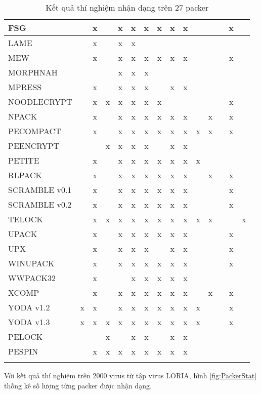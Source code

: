 \begin{tiny}
\begin{longtable}{|l|c|c|c|c|c|c|c|c|c|c|c|c|c|c|}
\hline
FSG					&	&x	&	&x	&x	&x	&x	&x	&x	&	&	&	&x	&	\\
\hline
LAME				&	&x	&	&x	&x	&	&	&	&	&	&	&	&	&	\\
\hline
MEW					&	&x	&	&x	&x	&x	&x	&x	&x	&	&	&	&x	&	\\
\hline
MORPHNAH			&	&	&	&x	&x	&x	&	&	&	&	&	&	&	&	\\
\hline
MPRESS				&	&x	&	&x	&x	&x	&	&x	&x	&	&	&	&	&	\\
\hline
NOODLECRYPT			&	&x	&x	&x	&x	&x	&x	&	&	&	&	&	&x	&	\\
\hline
NPACK				&	&x	&	&x	&x	&x	&x	&x	&x	&	&x	&	&x	&	\\
\hline
PECOMPACT			&	&x	&	&x	&x	&x	&x	&x	&x	&x	&x	&	&x	&	\\
\hline
PEENCRYPT			&	&	&x	&x	&x	&x	&	&x	&x	&	&	&	&	&	\\
\hline
PETITE				&	&x	&	&x	&x	&x	&x	&x	&x	&x	&	&	&	&	\\
\hline
RLPACK				&	&x	&	&x	&x	&x	&x	&x	&x	&	&x	&	&x	&	\\
\hline
SCRAMBLE v0.1		&	&x	&	&x	&x	&x	&x	&x	&x	&	&	&	&x	&	\\
\hline
SCRAMBLE v0.2		&	&x	&	&x	&x	&x	&x	&x	&x	&	&	&	&x	&	\\
\hline
TELOCK				&	&x	&x	&x	&x	&x	&x	&x	&x	&x	&x	&	&	&x	\\
\hline
UPACK				&	&x	&	&x	&x	&x	&x	&x	&x	&	&	&	&x	&	\\
\hline
UPX					&	&x	&	&x	&x	&x	&	&x	&x	&	&	&	&x	&	\\
\hline
WINUPACK			&	&x	&	&x	&x	&x	&x	&x	&x	&	&	&	&x	&	\\
\hline
WWPACK32			&	&x	&	&	&x	&x	&x	&x	&x	&	&	&	&	&	\\
\hline
XCOMP				&	&x	&	&x	&x	&x	&x	&x	&x	&	&x	&	&x	&	\\
\hline
YODA v1.2			&x	&x	&	&x	&x	&x	&x	&x	&x	&x	&	&	&x	&	\\
\hline
YODA v1.3			&x	&x	&x	&x	&x	&x	&x	&x	&x	&x	&	&	&x	&	\\
\hline
PELOCK				&	&	&x	&	&x	&x	&	&x	&x	&	&	&	&	&	\\
\hline
PESPIN				&	&x	&x	&x	&x	&x	&x	&x	&x	&	&	&	&	&	\\			
\hline
\caption {Kết quả thí nghiệm nhận dạng trên 27 packer}\label{tab:27PackerSemanticExp}
\end{longtable}
\end{tiny}

\hspace{0.5cm}Với kết quả thí nghiệm trên 2000 virus từ tập virus LORIA, hình \ref {fig:PackerStat} thống kê số lượng từng packer được nhận dạng.


